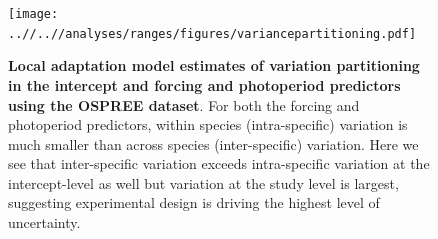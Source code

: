 \documentclass[12pt]{article}
\begin{document}
\begin{figure}[h!]
    \centering
 \texttt{[image: ..//..//analyses/ranges/figures/variancepartitioning.pdf]} 
    \caption{ \textbf{Local adaptation model estimates of variation partitioning in the intercept and forcing and photoperiod predictors using the OSPREE dataset}. For both the forcing and photoperiod predictors, within species (intra-specific) variation is much smaller than across species (inter-specific) variation. Here we see that inter-specific variation exceeds intra-specific variation at the intercept-level as well but variation at the study level is largest, suggesting experimental design is driving the highest level of uncertainty.}
    \label{fig:popy}
\end{figure}
\end{document}
